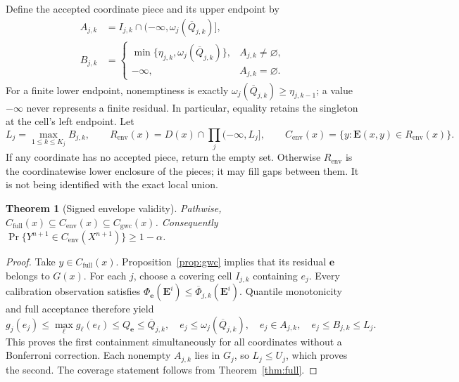 \documentclass[11pt]{article}
\newtheorem{theorem}{Theorem}[section]
\newcommand{\E}{\mathbf E}
\newcommand{\evec}{\mathbf e}
\newcommand{\Cenv}{C_{\mathrm{env}}}
\newcommand{\Cgwc}{C_{\mathrm{gwc}}}
\begin{document}
Define the accepted coordinate piece and its upper endpoint by
\begin{align}
 A_{j,k}&=I_{j,k}\cap(-\infty,\omega_j(\overline Q_{j,k})],\label{eq:piece}\\
 B_{j,k}&=
 \begin{cases}
 \min\{\eta_{j,k},\omega_j(\overline Q_{j,k})\},&A_{j,k}\ne\varnothing,\\
 -\infty,&A_{j,k}=\varnothing.
 \end{cases}\label{eq:B}
\end{align}
For a finite lower endpoint, nonemptiness is exactly
$\omega_j(\overline Q_{j,k})\ge\eta_{j,k-1}$; a value $-\infty$ never
represents a finite residual. In particular, equality retains the singleton at
the cell's left endpoint. Let
\begin{equation}\label{eq:L}
 L_j=\max_{1\le k\le K_j}B_{j,k},\qquad
 R_{\mathrm{env}}(x)=D(x)\cap\prod_j(-\infty,L_j],\qquad
 \Cenv(x)=\{y:\E(x,y)\in R_{\mathrm{env}}(x)\}.
\end{equation}
If any coordinate has no accepted piece, return the empty set. Otherwise
$R_{\mathrm{env}}$ is the coordinatewise lower enclosure of the pieces; it may
fill gaps between them. It is not being identified with the exact local union.

\begin{theorem}[Signed envelope validity]\label{thm:valid}
Pathwise, $C_{\mathrm{full}}(x)\subseteq\Cenv(x)\subseteq\Cgwc(x)$.
Consequently $\Pr\{Y^{n+1}\in\Cenv(X^{n+1})\}\ge1-\alpha$.
\end{theorem}
\begin{proof}
Take $y\in C_{\mathrm{full}}(x)$. Proposition~\ref{prop:gwc} implies that its
residual $\evec$ belongs to $G(x)$. For each $j$, choose a covering cell
$I_{j,k}$ containing $e_j$. Every calibration observation satisfies
$\Phi_{\evec}(\E^i)\le\overline\Phi_{j,k}(\E^i)$. Quantile monotonicity and
full acceptance therefore yield
\[
 g_j(e_j)\le\max_\ell g_\ell(e_\ell)
 \le Q_{\evec}\le\overline Q_{j,k},
 \quad e_j\le\omega_j(\overline Q_{j,k}),
 \quad e_j\in A_{j,k},
 \quad e_j\le B_{j,k}\le L_j.
\]
This proves the first containment simultaneously for all coordinates without a
Bonferroni correction. Each nonempty $A_{j,k}$ lies in $G_j$, so $L_j\le U_j$,
which proves the second. The coverage statement follows from
Theorem~\ref{thm:full}.
\end{proof}
\end{document}
